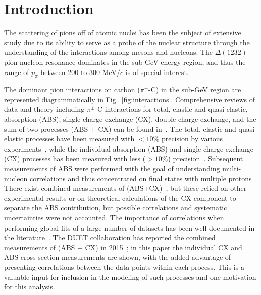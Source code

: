 \section{\label{sec:intro}Introduction\protect}
The scattering of pions off of atomic nuclei has been the subject of extensive study
due to its ability to serve as a probe of the nuclear structure 
through the understanding of the interactions among mesons and nucleons. The $\Delta(1232)$ pion-nucleon resonance dominates in the sub-GeV energy region, and thus the range of $p_{\pi}$ between 200 to 300 MeV$/c$ is of special interest.


The dominant pion interactions on carbon ($\pi^{\pm}$-{\color{red}C) in the sub-GeV region are represented diagrammatically in Fig.~\ref{fig:interactions}. Comprehensive reviews of data and theory including $\pi^{\pm}$-{\color{red}C interactions for total, elastic and quasi-elastic, absorption (ABS), single charge exchange (CX), double charge exchange, and the sum of two processes (ABS + CX) can be found in~\cite{review1,review2}. The total, elastic and quasi-elastic processes have been measured with $<10\%$ precision by various experiments~\cite{Allardyce,Binon,Gelderloos,Meirav,Moinester,Levenson,Ashery,Saunders1996,Jones1993}, while the individual absorption (ABS) and single charge exchange (CX) processes has been measured with less ($>10\%$) precision~\cite{Jones1993,Ashery2,Hilscher,Bowles,Bellotti1973,Bellotti1973_2}. Subsequent measurements of ABS were performed with the goal of understanding multi-nucleon correlations and thus concentrated on final states with multiple protons~\cite{Ransome1992,Jones1993,Gianelli2000}. There exist combined measurements of (ABS+CX)~\cite{Saunders1996,Ashery,Miller,navon,navon2}, but these relied on other experimental results or on theoretical calculations of the CX component to separate the ABS contribution, but possible correlations and systematic uncertainties were not accounted. The importance of correlations when performing global fits of a large number of datasets has been well documented in the literature~\cite{Pumplin,Stump,niwgPaper}}. The DUET collaboration has reported the combined measurements of (ABS + CX) in 2015~\cite{duet}; in this paper the individual CX and ABS cross-section measurements are shown, with the added advantage of presenting correlations between the data points within each process. This is a valuable input for inclusion in the modeling of such processes and one motivation for this analysis.}

